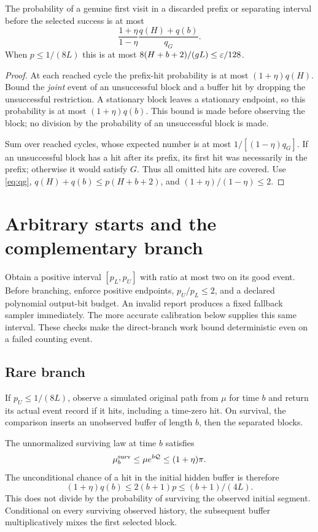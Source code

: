 \begin{lemma}\label{lem:omit}
The probability of a genuine first visit in a discarded prefix or separating interval before the selected success is at most
\begin{equation}
\frac{1+\eta}{1-\eta}\frac{q(H)+q(b)}{q_G}. \label{eq:omit}
\end{equation}
When $p\le1/(8L)$ this is at most $8(H+b+2)/(gL)\le\varepsilon/128$.
\end{lemma}
\begin{proof}
At each reached cycle the prefix-hit probability is at most $(1+\eta)q(H)$. Bound the \emph{joint} event of an unsuccessful block and a buffer hit by dropping the unsuccessful restriction. A stationary block leaves a stationary endpoint, so this probability is at most $(1+\eta)q(b)$. This bound is made before observing the block; no division by the probability of an unsuccessful block is made.

Sum over reached cycles, whose expected number is at most $1/[(1-\eta)q_G]$. If an unsuccessful block has a hit after its prefix, its first hit was necessarily in the prefix; otherwise it would satisfy $G$. Thus all omitted hits are covered. Use \eqref{eq:qg}, $q(H)+q(b)\le p(H+b+2)$, and $(1+\eta)/(1-\eta)\le2$.
\end{proof}

\section{Arbitrary starts and the complementary branch}
Obtain a positive interval $[p_L,p_U]$ with ratio at most two on its good event. Before branching, enforce positive endpoints, $p_U/p_L\le2$, and a declared polynomial output-bit budget. An invalid report produces a fixed fallback sampler immediately. The more accurate calibration below supplies this same interval. These checks make the direct-branch work bound deterministic even on a failed counting event.

\subsection{Rare branch}
If $p_U\le1/(8L)$, observe a simulated original path from $\mu$ for time $b$ and return its actual event record if it hits, including a time-zero hit. On survival, the comparison inserts an unobserved buffer of length $b$, then the separated blocks.

The unnormalized surviving law at time $b$ satisfies
\[
\mu_b^{\rm surv}\le\mu e^{b\mathcal Q}\le(1+\eta)\pi.
\]
The unconditional chance of a hit in the initial hidden buffer is therefore
\begin{equation}
(1+\eta)q(b)\le2(b+1)p\le(b+1)/(4L). \label{eq:initial}
\end{equation}
This does not divide by the probability of surviving the observed initial segment. Conditional on every surviving observed history, the subsequent buffer multiplicatively mixes the first selected block.

